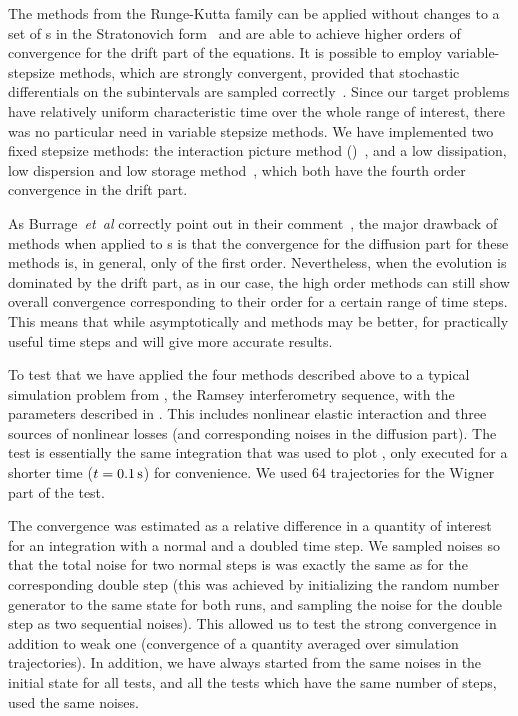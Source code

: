 The methods from the Runge-Kutta family can be applied without changes to a set of s in the Stratonovich form~\cite{Wilkie2004,Wilkie2005} and are able to achieve higher orders of convergence for the drift part of the equations.
It is possible to employ variable-stepsize methods, which are strongly convergent, provided that stochastic differentials on the subintervals are sampled correctly~\cite{Wilkie2005}.
Since our target problems have relatively uniform characteristic time over the whole range of interest, there was no particular need in variable stepsize methods.
We have implemented two fixed stepsize  methods: the  interaction picture method ()~\cite{CaradocDavies2000}, and a low dissipation, low dispersion and low storage  method~\cite{Berland2006}, which both have the fourth order convergence in the drift part.

As Burrage~\textit{et~al} correctly point out in their comment~\cite{Burrage2006}, the major drawback of  methods when applied to s is that the convergence for the diffusion part for these methods is, in general, only of the first order.
Nevertheless, when the evolution is dominated by the drift part, as in our case, the high order methods can still show overall convergence corresponding to their order for a certain range of time steps.
This means that while asymptotically  and  methods may be better, for practically useful time steps  and  will give more accurate results.

To test that we have applied the four methods described above to a typical simulation problem from , the Ramsey interferometry sequence, with the parameters described in .
This includes nonlinear elastic interaction and three sources of nonlinear losses (and corresponding noises in the diffusion part).
The test is essentially the same integration that was used to plot , only executed for a shorter time ($t=0.1\mbox{\ensuremath{\,\mathrm{s}}}$) for convenience.
We used $64$ trajectories for the Wigner part of the test.

The convergence was estimated as a relative difference in a quantity of interest for an integration with a normal and a doubled time step.
We sampled noises so that the total noise for two normal steps is was exactly the same as for the corresponding double step (this was achieved by initializing the random number generator to the same state for both runs, and sampling the noise for the double step as two sequential noises).
This allowed us to test the strong convergence in addition to weak one (convergence of a quantity averaged over simulation trajectories).
In addition, we have always started from the same noises in the initial state for all tests, and all the tests which have the same number of steps, used the same noises.

